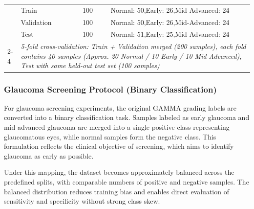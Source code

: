\documentclass[preprint,12pt]{elsarticle}
\begin{document}
\begin{table}[!t]
\begin{tabular}{|p{}|p{}|p{}|p{}|}
                                     & Train                                                                                                                                                                                                                                           & 100                    & Normal: 50,\quad Early: 26,\quad Mid-Advanced: 24 \\
                                     & Validation                                                                                                                                                                                                                                      & 100                    & Normal: 50,\quad Early: 26,\quad Mid-Advanced: 24 \\
                                     & Test                                                                                                                                                                                                                                            & 100                    & Normal: 51,\quad Early: 25,\quad Mid-Advanced: 24 \\
        \cline{2-4}
                                     & \multicolumn{3}{|p{0.73\textwidth}|}{\textit{5-fold cross-validation: Train + Validation merged (200 samples), each fold contains 40 samples (Approx. 20 Normal / 10 Early / 10 Mid-Advanced), Test with same held-out test set (100 samples)}}                                                                              \\
        \hline
    \end{tabular}
\end{table}

\subsubsection{Glaucoma Screening Protocol (Binary Classification)}
\label{subsec322}

For glaucoma screening experiments, the original GAMMA grading labels are converted into a binary classification task. Samples labeled as early glaucoma and mid-advanced glaucoma are merged into a single positive class representing glaucomatous eyes, while normal samples form the negative class. This formulation reflects the clinical objective of screening, which aims to identify glaucoma as early as possible.

Under this mapping, the dataset becomes approximately balanced across the predefined splits, with comparable numbers of positive and negative samples. The balanced distribution reduces training bias and enables direct evaluation of sensitivity and specificity without strong class skew.
\end{document}

